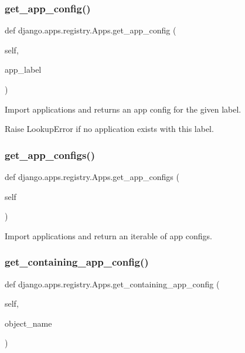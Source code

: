 \subsubsection{\texorpdfstring{get\+\_\+app\+\_\+config()}{get\_app\_config()}}
{\footnotesize\ttfamily def django.\+apps.\+registry.\+Apps.\+get\+\_\+app\+\_\+config (\begin{DoxyParamCaption}\item[{}]{self,  }\item[{}]{app\+\_\+label }\end{DoxyParamCaption})}

\begin{DoxyVerb}Import applications and returns an app config for the given label.

Raise LookupError if no application exists with this label.
\end{DoxyVerb}
 \mbox{\label{classdjango_1_1apps_1_1registry_1_1_apps_a61d77b3e6418c9a0f4a275a02dc6ea77}} 
\subsubsection{\texorpdfstring{get\+\_\+app\+\_\+configs()}{get\_app\_configs()}}
{\footnotesize\ttfamily def django.\+apps.\+registry.\+Apps.\+get\+\_\+app\+\_\+configs (\begin{DoxyParamCaption}\item[{}]{self }\end{DoxyParamCaption})}

\begin{DoxyVerb}Import applications and return an iterable of app configs.\end{DoxyVerb}
 \mbox{\label{classdjango_1_1apps_1_1registry_1_1_apps_a6bf08657a76fffc35ac36397c5bf8b52}} 
\subsubsection{\texorpdfstring{get\+\_\+containing\+\_\+app\+\_\+config()}{get\_containing\_app\_config()}}
{\footnotesize\ttfamily def django.\+apps.\+registry.\+Apps.\+get\+\_\+containing\+\_\+app\+\_\+config (\begin{DoxyParamCaption}\item[{}]{self,  }\item[{}]{object\+\_\+name }\end{DoxyParamCaption})}

